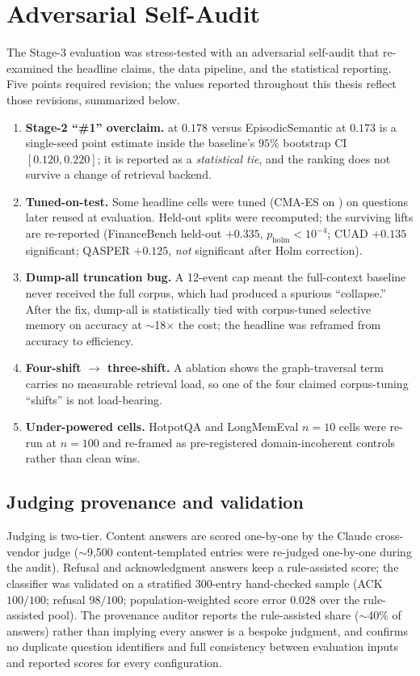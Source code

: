 \chapter{Adversarial Self-Audit}
\label{app:honesty}

The Stage-3 evaluation was stress-tested with an adversarial self-audit that
re-examined the headline claims, the data pipeline, and the statistical
reporting. Five points required revision; the values reported throughout this
thesis reflect those revisions, summarized below.

\begin{enumerate}[leftmargin=1.6em]
  \item \textbf{Stage-2 ``\#1'' overclaim.} \Vfour{} at $0.178$ versus
  EpisodicSemantic at $0.173$ is a single-seed point estimate inside the
  baseline's $95\%$ bootstrap CI $[0.120,0.220]$; it is reported as a
  \emph{statistical tie}, and the ranking does not survive a change of retrieval
  backend.
  \item \textbf{Tuned-on-test.} Some headline cells were tuned (CMA-ES on
  \recallk{}) on questions later reused at evaluation. Held-out splits were
  recomputed; the surviving lifts are re-reported (FinanceBench held-out
  $+0.335$, $p_{\mathrm{holm}}<10^{-4}$; CUAD $+0.135$ significant; QASPER
  $+0.125$, \emph{not} significant after Holm correction).
  \item \textbf{Dump-all truncation bug.} A 12-event cap meant the full-context
  baseline never received the full corpus, which had produced a spurious
  ``collapse.'' After the fix, dump-all is statistically tied with corpus-tuned
  selective memory on accuracy at $\sim$18$\times$ the cost; the headline was
  reframed from accuracy to efficiency.
  \item \textbf{Four-shift $\rightarrow$ three-shift.} A \wgraph{} ablation shows
  the graph-traversal term carries no measurable retrieval load, so one of the
  four claimed corpus-tuning ``shifts'' is not load-bearing.
  \item \textbf{Under-powered cells.} HotpotQA and LongMemEval $n{=}10$ cells
  were re-run at $n{=}100$ and re-framed as pre-registered domain-incoherent
  controls rather than clean wins.
\end{enumerate}

\section*{Judging provenance and validation}
Judging is two-tier. Content answers are scored one-by-one by the Claude
cross-vendor judge ($\sim$9{,}500 content-templated entries were re-judged
one-by-one during the audit). Refusal and acknowledgment answers keep a
rule-assisted score; the classifier was validated on a stratified 300-entry
hand-checked sample (ACK $100/100$; refusal $98/100$; population-weighted
score error $0.028$ over the rule-assisted pool). The provenance auditor reports
the rule-assisted share ($\sim$40\% of answers) rather than implying every answer
is a bespoke judgment, and confirms no duplicate question identifiers and full
consistency between evaluation inputs and reported scores for every
configuration.

